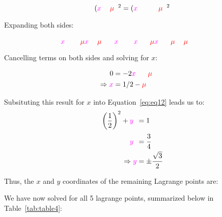 \begin{equation*}
    \left(\cm x \cw + \cred \mu \cw\right)^2 = \left(\cm x \cw - 1 + \cred \mu \cw\right)^2
\end{equation*}

Expanding both sides:

\begin{equation*}
    \cm x\cw^2+2\cred\mu\cm x\cw+\cred\mu\cw^2=
    \cm x\cw^2-2\cm x\cw+2\cred\mu\cm x\cw-2\cred\mu\cw+
    \cred\mu\cw^2+1
\end{equation*}

Cancelling terms on both sides and solving for $x$:

\begin{align*}
    0                    & = -2\cm x\cw-2\cred\mu\cw+1 \\
    \Rightarrow \cm x\cw & = 1/2 -\cred\mu\cw
\end{align*}

\pagebreak

Subsituting this result for $x$ into Equation~\eqref{eq:eq12} leads us to:
\begin{align*}
    \left(\frac{1}{2}\right)^2+\cm y\cw^2 & = 1                      \\
    \cm y\cw^2                            & = \cfrac{3}{4}           \\
    \Rightarrow \cm y\cw                  & = \pm\cfrac{\sqrt{3}}{2}
\end{align*}

Thus, the $x$ and $y$ coordinates of the remaining Lagrange points are:

\begin{center}
\end{center}

We have now solved for all 5 lagrange points, summarized below in Table~\ref{tab:table4}:

